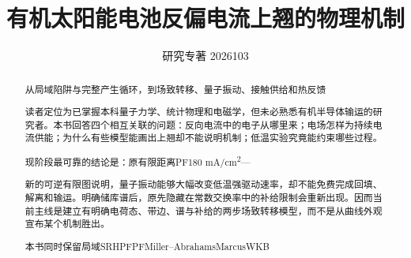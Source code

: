 \documentclass[11pt,a4paper]{article}
\begin{document}
\begin{titlepage}
\title{\textbf{{\cjkfont 有机太阳能电池反偏电流上翘的物理机制}\allowbreak{}}}
\author{}
\date{{\cjkfont 研究专著}\allowbreak{} 2026\allowbreak{}10\allowbreak{}3\allowbreak{}}
\maketitle
\thispagestyle{empty}
\begin{abstract}
{\cjkfont 从局域陷阱与完整产生循环，到场致转移、量子振动、接触供给和热反馈}\allowbreak{}
\par
{\cjkfont 读者定位为已掌握本科量子力学、统计物理和电磁学，但未必熟悉有机半导体输运的研究者。本书回答四个相互关联的问题：反向电流中的电子从哪里来；电场怎样为持续电流供能；为什么有些模型能画出上翘却不能说明机制；低温实验究竟能约束哪些过程。}\allowbreak{}
\par
{\cjkfont 现阶段最可靠的结论是：原有限距离}\allowbreak{}PF\allowbreak{}180 mA/cm\textsuperscript{2}\allowbreak{}—\allowbreak{}
\par
{\cjkfont 新的可逆有限图说明，量子振动能够大幅改变低温强驱动速率，却不能免费完成回填、解离和输运。明确储库谱后，原先隐藏在常数交换率中的补给限制会重新出现。因而当前主线是建立有明确电荷态、带边、谱与补给的两步场致转移模型，而不是从曲线外观宣布某个机制胜出。}\allowbreak{}
\par
{\cjkfont 本书同时保留局域}\allowbreak{}SRH\allowbreak{}PF\allowbreak{}PF\allowbreak{}Miller–Abrahams\allowbreak{}Marcus\allowbreak{}WKB\allowbreak{}

\end{abstract}
\end{titlepage}
\end{document}
